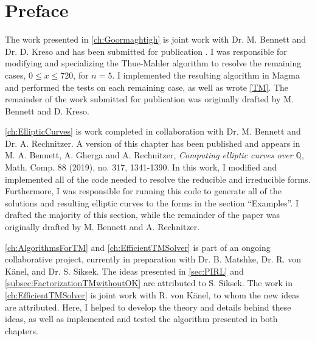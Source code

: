 
\chapter{Preface}

The work presented in \autoref{ch:Goormaghtigh} is joint work with Dr. M. Bennett and Dr. D. Kreso and has been submitted for publication \cite{BeGhKr}. I was responsible for modifying and specializing the Thue-Mahler algorithm to resolve the remaining cases, $0 \leq x \leq 720$, for $n = 5$. I implemented the resulting algorithm in Magma and performed the tests on each remaining case, as well as wrote \autoref{TM}. The remainder of the work submitted for publication was originally drafted by M. Bennett and D. Kreso. 

\autoref{ch:EllipticCurves} is work completed in collaboration with Dr. M. Bennett and Dr. A. Rechnitzer. A version of this chapter has been published and appears in M. A. Bennett, A. Gherga and A. Rechnitzer, \emph{Computing elliptic curves over $\mathbb{Q}$}, Math. Comp. 88 (2019), no. 317, 1341-1390. In this work, I modified and implemented all of the code needed to resolve the reducible and irreducible forms. Furthermore, I was responsible for running this code to generate all of the solutions and resulting elliptic curves to the forms in the section ``Examples''. I drafted the majority of this section, while the remainder of the paper was originally drafted by M. Bennett and A. Rechnitzer.

\autoref{ch:AlgorithmsForTM} and \autoref{ch:EfficientTMSolver} is part of an ongoing collaborative project, currently in preparation \cite{GhKaMaSi} with Dr. B. Matshke, Dr. R. von K\"anel, and Dr. S. Siksek. The ideas presented in \autoref{sec:PIRL} and \autoref{subsec:FactorizationTMwithoutOK} are attributed to S. Siksek. The work in \autoref{ch:EfficientTMSolver} is joint work with R. von K\"anel, to whom the new ideas are attributed. Here, I helped to develop the theory and details behind these ideas, as well as implemented and tested the algorithm presented in both chapters.


